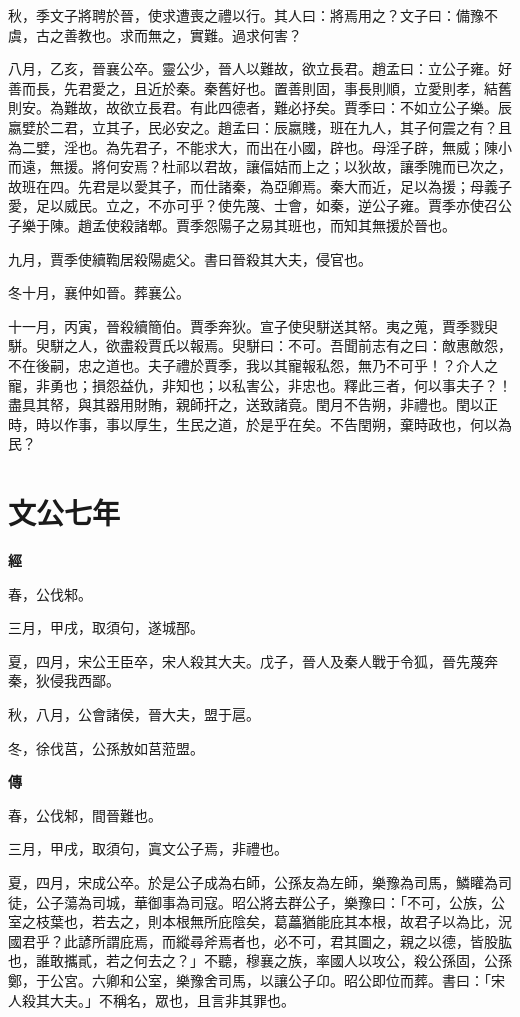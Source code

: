 \documentclass{ctexart}
\begin{document}
秋，季文子將聘於晉，使求遭喪之禮以行。其人曰：將焉用之？文子曰：備豫不虞，古之善教也。求而無之，實難。過求何害？

八月，乙亥，晉襄公卒。靈公少，晉人以難故，欲立長君。趙孟曰：立公子雍。好善而長，先君愛之，且近於秦。秦舊好也。置善則固，事長則順，立愛則孝，結舊則安。為難故，故欲立長君。有此四德者，難必抒矣。賈季曰：不如立公子樂。辰嬴嬖於二君，立其子，民必安之。趙孟曰：辰嬴賤，班在九人，其子何震之有？且為二嬖，淫也。為先君子，不能求大，而出在小國，辟也。母淫子辟，無威；陳小而遠，無援。將何安焉？杜祁以君故，讓偪姞而上之；以狄故，讓季隗而已次之，故班在四。先君是以愛其子，而仕諸秦，為亞卿焉。秦大而近，足以為援；母義子愛，足以威民。立之，不亦可乎？使先蔑、士會，如秦，逆公子雍。賈季亦使召公子樂于陳。趙孟使殺諸郫。賈季怨陽子之易其班也，而知其無援於晉也。

九月，賈季使續鞫居殺陽處父。書曰晉殺其大夫，侵官也。

冬十月，襄仲如晉。葬襄公。

十一月，丙寅，晉殺續簡伯。賈季奔狄。宣子使臾駢送其帑。夷之蒐，賈季戮臾駢。臾駢之人，欲盡殺賈氏以報焉。臾駢曰：不可。吾聞前志有之曰：敵惠敵怨，不在後嗣，忠之道也。夫子禮於賈季，我以其寵報私怨，無乃不可乎！？介人之寵，非勇也；損怨益仇，非知也；以私害公，非忠也。釋此三者，何以事夫子？！盡具其帑，與其器用財賄，親師扞之，送致諸竟。閏月不告朔，非禮也。閏以正時，時以作事，事以厚生，生民之道，於是乎在矣。不告閏朔，棄時政也，何以為民？





\section{文公七年}


\textbf{經}



春，公伐邾。

三月，甲戌，取須句，遂城郚。

夏，四月，宋公王臣卒，宋人殺其大夫。戊子，晉人及秦人戰于令狐，晉先蔑奔秦，狄侵我西鄙。

秋，八月，公會諸侯，晉大夫，盟于扈。

冬，徐伐莒，公孫敖如莒蒞盟。 

\textbf{傳}



春，公伐邾，間晉難也。

三月，甲戌，取須句，寘文公子焉，非禮也。 

夏，四月，宋成公卒。於是公子成為右師，公孫友為左師，樂豫為司馬，鱗矔為司徒，公子蕩為司城，華御事為司寇。昭公將去群公子，樂豫曰：「不可，公族，公室之枝葉也，若去之，則本根無所庇陰矣，葛藟猶能庇其本根，故君子以為比，況國君乎？此諺所謂庇焉，而縱尋斧焉者也，必不可，君其圖之，親之以德，皆股肱也，誰敢攜貳，若之何去之？」不聽，穆襄之族，率國人以攻公，殺公孫固，公孫鄭，于公宮。六卿和公室，樂豫舍司馬，以讓公子卬。昭公即位而葬。書曰：「宋人殺其大夫。」不稱名，眾也，且言非其罪也。
\end{document}
